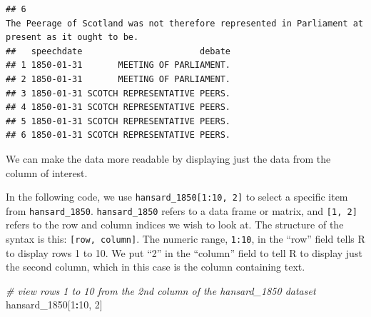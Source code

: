 \documentclass[
]{article}
\newenvironment{Shaded}{\begin{snugshade}}{\end{snugshade}}
\newcommand{\CommentTok}[1]{\textcolor[rgb]{0.56,0.35,0.01}{\textit{#1}}}
\newcommand{\DecValTok}[1]{\textcolor[rgb]{0.00,0.00,0.81}{#1}}
\newcommand{\NormalTok}[1]{#1}
\newcommand{\SpecialCharTok}[1]{\textcolor[rgb]{0.81,0.36,0.00}{\textbf{#1}}}
\begin{document}
\begin{verbatim}
## 6                                                                                                                                                                                                                                                                                                                                                           The Peerage of Scotland was not therefore represented in Parliament at present as it ought to be.
##   speechdate                       debate
## 1 1850-01-31       MEETING OF PARLIAMENT.
## 2 1850-01-31       MEETING OF PARLIAMENT.
## 3 1850-01-31 SCOTCH REPRESENTATIVE PEERS.
## 4 1850-01-31 SCOTCH REPRESENTATIVE PEERS.
## 5 1850-01-31 SCOTCH REPRESENTATIVE PEERS.
## 6 1850-01-31 SCOTCH REPRESENTATIVE PEERS.
\end{verbatim}

We can make the data more readable by displaying just the data from the
column of interest.

In the following code, we use \texttt{hansard\_1850{[}1:10,\ 2{]}} to
select a specific item from \texttt{hansard\_1850}.
\texttt{hansard\_1850} refers to a data frame or matrix, and
\texttt{{[}1,\ 2{]}} refers to the row and column indices we wish to
look at. The structure of the syntax is this:
\texttt{{[}row,\ column{]}}. The numeric range, \texttt{1:10}, in the
``row'' field tells R to display rows 1 to 10. We put ``2'' in the
``column'' field to tell R to display just the second column, which in
this case is the column containing text.

\begin{Shaded}
\begin{Highlighting}[]
\CommentTok{\# view rows 1 to 10 from the 2nd column of the hansard\_1850 dataset}
\NormalTok{hansard\_1850[}\DecValTok{1}\SpecialCharTok{:}\DecValTok{10}\NormalTok{, }\DecValTok{2}\NormalTok{]}
\end{Highlighting}
\end{Shaded}
\end{document}
